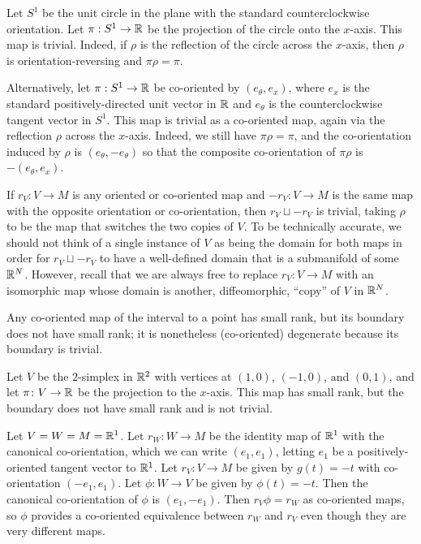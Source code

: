 \begin{example}
Let $S^1$ be the unit circle in the plane with the standard counterclockwise orientation. Let $\pi: S^1 \to \mathbb{R}$ be the projection of the circle onto the $x$-axis. This map is trivial. Indeed, if $\rho$ is the reflection of the circle across the $x$-axis, then $\rho$ is orientation-reversing and $\pi \rho = \pi$.

Alternatively, let $\pi:S^1 \to \mathbb{R}$ be co-oriented by $(e_\theta,e_x)$, where $e_x$ is the standard positively-directed unit vector in $\mathbb{R}$ and $e_\theta$ is the counterclockwise tangent vector in $S^1$. This map is trivial as a co-oriented map, again via the reflection $\rho$ across the $x$-axis. Indeed, we still have $\pi \rho = \pi$, and the co-orientation induced by $\rho$ is $(e_\theta,-e_\theta)$ so that the composite co-orientation of $\pi\rho$ is $-(e_\theta,e_x)$.
\end{example}

\begin{example}
If $r_V \colon V \to M$ is any oriented or co-oriented map and $-r_V \colon V \to M$ is the same map with the opposite orientation or co-orientation, then $r_V \sqcup -r_V$ is trivial, taking $\rho$ to be the map that switches the two copies of $V$. To be technically accurate, we should not think of a single instance of $V$ as being the domain for both maps in order for $r_V \sqcup -r_V$ to have a well-defined domain that is a submanifold of some $\mathbb{R}^N$. However, recall that we are always free to replace $r_V \colon V \to M$ with an isomorphic map whose domain is another, diffeomorphic, ``copy'' of $V$ in $\mathbb{R}^N$.
\end{example}

\begin{example}
Any co-oriented map of the interval to a point has small rank, but its boundary does not have small rank; it is nonetheless (co-oriented) degenerate because its boundary is trivial.
\end{example}

\begin{example}\label{E: projected triangle}
Let $V$ be the $2$-simplex in $\mathbb{R}^2$ with vertices at $(1,0)$, $(-1,0)$, and $(0,1)$, and let $\pi \colon V \to \mathbb{R}$ be the projection to the $x$-axis. This map has small rank, but the boundary does not have small rank and is not trivial.
\end{example}

\begin{example}
Let $V = W = M = \mathbb{R}^1$. Let $r_W \colon W \to M$ be the identity map of $\mathbb{R}^1$ with the canonical co-orientation, which we can write $(e_1,e_1)$, letting $e_1$ be a positively-oriented tangent vector to $\mathbb{R}^1$. Let $r_V \colon V \to M$ be given by $g(t) = -t$ with co-orientation $(-e_1,e_1)$. Let $\phi \colon W \to V$ be given by $\phi(t) = -t$. Then the canonical co-orientation of $\phi$ is $(e_1,-e_1)$. Then $r_V\phi = r_W$ as co-oriented maps, so $\phi$ provides a co-oriented equivalence between $r_W$ and $r_V$ even though they are very different maps.
\end{example}

